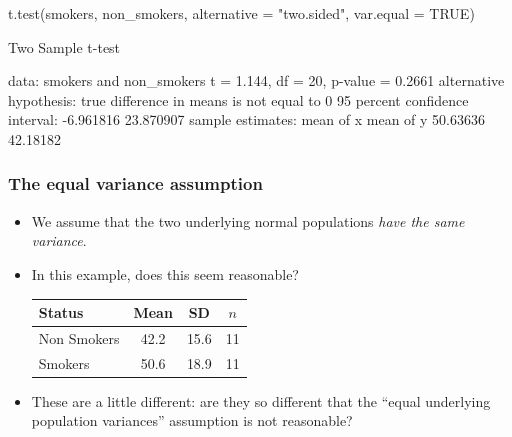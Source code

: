 \documentclass[a4paper]{article}
\begin{document}
\begin{Schunk}
\begin{Sinput}
t.test(smokers, non_smokers,
       alternative = "two.sided",
       var.equal = TRUE)
\end{Sinput}
\begin{Soutput}

	Two Sample t-test

data:  smokers and non_smokers
t = 1.144, df = 20, p-value = 0.2661
alternative hypothesis: true difference in means is not equal to 0
95 percent confidence interval:
 -6.961816 23.870907
sample estimates:
mean of x mean of y 
 50.63636  42.18182 
\end{Soutput}
\end{Schunk}
\subsubsection{The equal variance assumption}
\begin{itemize}
	\item We assume that the two underlying normal populations \textit{have the same variance}.
	\item In this example, does this seem reasonable?
	\begin{table}[H]\centering
		\begin{tabular}{@{}lccc@{}}
		\toprule
		Status      & Mean & SD   & \( n \)   \\ \midrule
		Non Smokers & 42.2 & 15.6 & 11 \\
		Smokers     & 50.6 & 18.9 & 11 \\ \bottomrule
		\end{tabular}
	\end{table}
	\item These are a little different: are they so different that the ``equal underlying population variances'' assumption is not reasonable?
\end{itemize}
\end{document}
